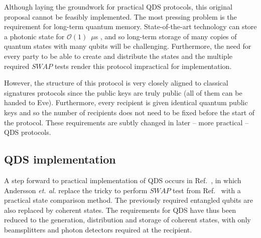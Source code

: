 

Although laying the groundwork for practical QDS protocols, this original proposal cannot be feasibly implemented. The most pressing problem is the requirement for long-term quantum memory. State-of-the-art technology can store a photonic state for $\mathcal{O}\left(1\right)$~$\mu$s \cite{Wang2019e}, and so long-term storage of many copies of quantum states with many qubits will be challenging. Furthermore, the need for every party to be able to create and distribute the states and the multiple required $SWAP$ tests render this protocol impractical for implementation. 

However, the structure of this protocol is very closely aligned to classical signatures protocols since the public keys are truly public (all of them can be handed to Eve). Furthermore, every recipient is given identical quantum public keys and so the number of recipients does not need to be fixed before the start of the protocol. These requirements are subtly changed in later -- more practical -- QDS protocols. %


\subsection{QDS implementation}
A step forward to practical implementation of QDS occurs in Ref.~\cite{Andersson2006}, in which Andersson \emph{et. al.} replace the tricky to perform $SWAP$ test from Ref.~\cite{Gottesman2001} with a practical state comparison method. The previously required entangled qubits are also replaced by coherent states. The requirements for QDS have thus been reduced to the generation, distribution and storage of coherent states, with only beamsplitters and photon detectors required at the recipient. 

